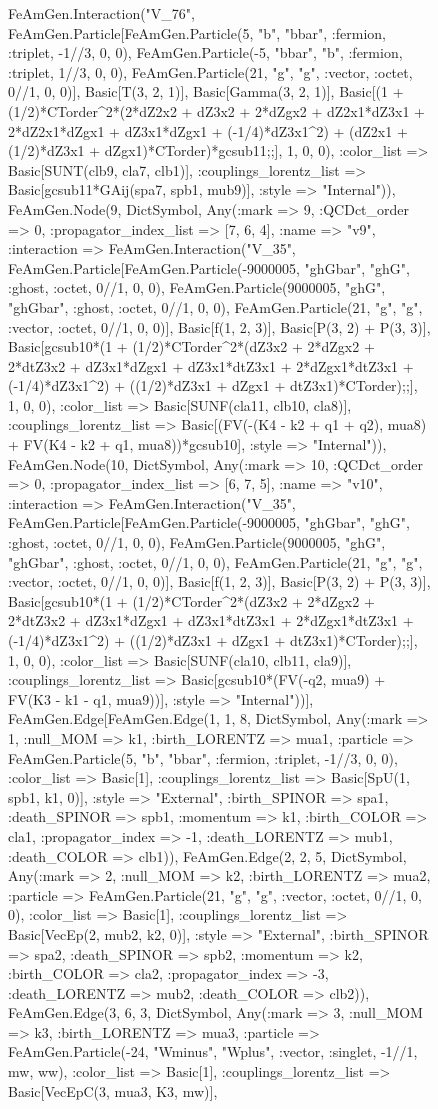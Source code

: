 \documentclass{revtex4}
\begin{document}
\begin{figure}[!htb]
\begin{center}
{FeAmGen.Interaction("V_76", FeAmGen.Particle[FeAmGen.Particle(5, "b", "bbar", :fermion, :triplet, -1//3, 0, 0), FeAmGen.Particle(-5, "bbar", "b", :fermion, :triplet, 1//3, 0, 0), FeAmGen.Particle(21, "g", "g", :vector, :octet, 0//1, 0, 0)], Basic[T(3, 2, 1)], Basic[Gamma(3, 2, 1)], Basic[(1 + (1/2)*CTorder^2*(2*dZ2x2 + dZ3x2 + 2*dZgx2 + dZ2x1*dZ3x1 + 2*dZ2x1*dZgx1 + dZ3x1*dZgx1 + (-1/4)*dZ3x1^2) + (dZ2x1 + (1/2)*dZ3x1 + dZgx1)*CTorder)*gcsub11;;], 1, 0, 0), :color_list => Basic[SUNT(clb9, cla7, clb1)], :couplings_lorentz_list => Basic[gcsub11*GAij(spa7, spb1, mub9)], :style => "Internal")), FeAmGen.Node(9, Dict{Symbol, Any}(:mark => 9, :QCDct_order => 0, :propagator_index_list => [7, 6, 4], :name => "v9", :interaction => FeAmGen.Interaction("V_35", FeAmGen.Particle[FeAmGen.Particle(-9000005, "ghGbar", "ghG", :ghost, :octet, 0//1, 0, 0), FeAmGen.Particle(9000005, "ghG", "ghGbar", :ghost, :octet, 0//1, 0, 0), FeAmGen.Particle(21, "g", "g", :vector, :octet, 0//1, 0, 0)], Basic[f(1, 2, 3)], Basic[P(3, 2) + P(3, 3)], Basic[gcsub10*(1 + (1/2)*CTorder^2*(dZ3x2 + 2*dZgx2 + 2*dtZ3x2 + dZ3x1*dZgx1 + dZ3x1*dtZ3x1 + 2*dZgx1*dtZ3x1 + (-1/4)*dZ3x1^2) + ((1/2)*dZ3x1 + dZgx1 + dtZ3x1)*CTorder);;], 1, 0, 0), :color_list => Basic[SUNF(cla11, clb10, cla8)], :couplings_lorentz_list => Basic[(FV(-(K4 - k2 + q1 + q2), mua8) + FV(K4 - k2 + q1, mua8))*gcsub10], :style => "Internal")), FeAmGen.Node(10, Dict{Symbol, Any}(:mark => 10, :QCDct_order => 0, :propagator_index_list => [6, 7, 5], :name => "v10", :interaction => FeAmGen.Interaction("V_35", FeAmGen.Particle[FeAmGen.Particle(-9000005, "ghGbar", "ghG", :ghost, :octet, 0//1, 0, 0), FeAmGen.Particle(9000005, "ghG", "ghGbar", :ghost, :octet, 0//1, 0, 0), FeAmGen.Particle(21, "g", "g", :vector, :octet, 0//1, 0, 0)], Basic[f(1, 2, 3)], Basic[P(3, 2) + P(3, 3)], Basic[gcsub10*(1 + (1/2)*CTorder^2*(dZ3x2 + 2*dZgx2 + 2*dtZ3x2 + dZ3x1*dZgx1 + dZ3x1*dtZ3x1 + 2*dZgx1*dtZ3x1 + (-1/4)*dZ3x1^2) + ((1/2)*dZ3x1 + dZgx1 + dtZ3x1)*CTorder);;], 1, 0, 0), :color_list => Basic[SUNF(cla10, clb11, cla9)], :couplings_lorentz_list => Basic[gcsub10*(FV(-q2, mua9) + FV(K3 - k1 - q1, mua9))], :style => "Internal"))], FeAmGen.Edge[FeAmGen.Edge(1, 1, 8, Dict{Symbol, Any}(:mark => 1, :null_MOM => k1, :birth_LORENTZ => mua1, :particle => FeAmGen.Particle(5, "b", "bbar", :fermion, :triplet, -1//3, 0, 0), :color_list => Basic[1], :couplings_lorentz_list => Basic[SpU(1, spb1, k1, 0)], :style => "External", :birth_SPINOR => spa1, :death_SPINOR => spb1, :momentum => k1, :birth_COLOR => cla1, :propagator_index => -1, :death_LORENTZ => mub1, :death_COLOR => clb1)), FeAmGen.Edge(2, 2, 5, Dict{Symbol, Any}(:mark => 2, :null_MOM => k2, :birth_LORENTZ => mua2, :particle => FeAmGen.Particle(21, "g", "g", :vector, :octet, 0//1, 0, 0), :color_list => Basic[1], :couplings_lorentz_list => Basic[VecEp(2, mub2, k2, 0)], :style => "External", :birth_SPINOR => spa2, :death_SPINOR => spb2, :momentum => k2, :birth_COLOR => cla2, :propagator_index => -3, :death_LORENTZ => mub2, :death_COLOR => clb2)), FeAmGen.Edge(3, 6, 3, Dict{Symbol, Any}(:mark => 3, :null_MOM => k3, :birth_LORENTZ => mua3, :particle => FeAmGen.Particle(-24, "Wminus", "Wplus", :vector, :singlet, -1//1, mw, ww), :color_list => Basic[1], :couplings_lorentz_list => Basic[VecEpC(3, mua3, K3, mw)], }
\end{center}
\end{figure}
\end{document}
